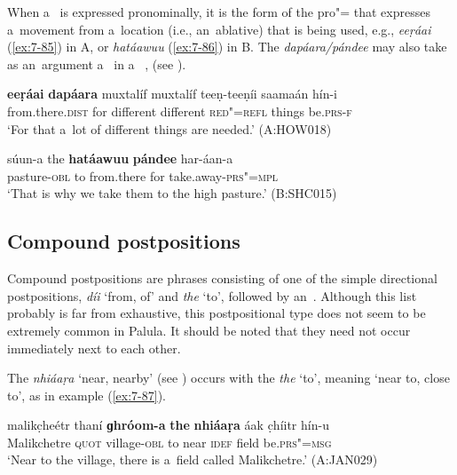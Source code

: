 \begin{exe}
When a~ is expressed pronominally, it is the form of the pro"= that expresses a~movement from a~location (i.e., an~ablative) that is being used, e.g., \textit{eeṛáai} (\ref{ex:7-85}) in A, or \textit{hatáawuu} (\ref{ex:7-86}) in B. The  \textit{dapáara/pándee} may also take as an~argument a~ in a~ , (see ).

\ea
\label{ex:7-85}
\gll \textbf{eeṛáai} \textbf{dapáara} muxtalíf muxtalíf teeṇ-teeṇíi saamaán hín-i\\
from.there.\textsc{dist} for different different \textsc{red"=refl}  things be.\textsc{prs-f}\\
\glt `For that a~lot of different things are needed.' (A:HOW018)
\z 

\begin{exe}
\ex
\label{ex:7-86}
\gll súun-a the \textbf{hatáawuu} \textbf{pándee} har-áan-a \\
pasture-\textsc{obl} to from.there for take.away-\textsc{prs"=mpl} \\
\glt `That is why we take them to the high pasture.' (B:SHC015)
\end{exe}


\subsection{Compound postpositions}
\label{subsec:7-2-3}

Compound postpositions are phrases consisting of one of the simple directional postpositions, \textit{díi} `from, of' and \textit{the} `to', followed by an~. Although this list probably is far from exhaustive, this postpositional type does not seem to be extremely common in Palula. It should be noted that they need not occur immediately next to each other.


The  \textit{nhiáaṛa} `near, nearby' (see ) occurs with the  \textit{the} `to', meaning `near to, close to', as in example (\ref{ex:7-87}). 

\begin{exe}
\ex
\label{ex:7-87}
\gll malikc̣heétr thaní \textbf{ɡhróom-a} \textbf{the} \textbf{nhiáaṛa} áak c̣híitr hín-u \\
Malikchetre \textsc{quot} village-\textsc{obl} to near \textsc{idef} field be.\textsc{prs"=msg} \\
\glt `Near to the village, there is a~field called Malikchetre.' (A:JAN029)
\end{exe}


\end{exe}
